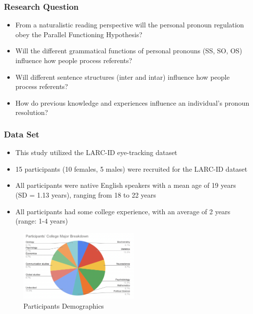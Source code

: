 \documentclass{beamer}
\begin{document}
\begin{frame}
\frametitle{Research Question}
\begin{itemize}
    \item From a naturalistic reading perspective will the personal pronoun regulation obey the Parallel Functioning Hypothesis?
    \item Will the different grammatical functions of personal pronouns (SS, SO, OS) influence how people process referents?
    \item Will different sentence structures (inter and intar) influence how people process referents?
    \item How do previous knowledge and experiences influence an individual's pronoun resolution?

\end{itemize}
\end{frame}

\begin{frame}
\frametitle{Data Set}
\begin{itemize}
    \item This study utilized the LARC-ID eye-tracking dataset \cite{harris2021angeles} 
    \item 15 participants (10 females, 5 males) were recruited for the LARC-ID dataset
    \item All participants were native English speakers with a mean age of 19 years (SD = 1.13 years), ranging from 18 to 22 years
    \item All participants had some college experience, with an average of 2 years (range: 1-4 years)
\end{itemize}
\begin{figure}
    \centering
\includegraphics[width=6cm,keepaspectratio]{figures/demographics.png}
    \caption{Participants Demographics}
    \label{Figure:Participants Demographics}
\end{figure}
\end{frame}
\end{document}
